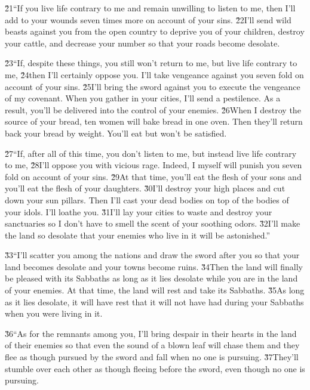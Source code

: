 \v{21}``If you live life contrary to me and remain unwilling to listen to me, then I'll add to your wounds seven times more on account of your sins. \v{22}I'll send wild beasts against you from the open country to deprive you of your children, destroy your cattle, and decrease your number so that your roads become desolate.

\v{23}``If, despite these things, you still won't return to me, but live life contrary to me, \v{24}then I'll certainly oppose you. I'll take vengeance against you seven fold on account of your sins. \v{25}I'll bring the sword against you to execute the vengeance of my covenant. When you gather in your cities, I'll send a pestilence. As a result, you'll be delivered into the control of your enemies. \v{26}When I destroy the source of your bread, ten women will bake bread in one oven. Then they'll return back your bread by weight. You'll eat but won't be satisfied.

\v{27}``If, after all of this time, you don't listen to me, but instead live life contrary to me, \v{28}I'll oppose you with vicious rage. Indeed, I myself will punish you seven fold on account of your sins. \v{29}At that time, you'll eat the flesh of your sons and you'll eat the flesh of your daughters. \v{30}I'll destroy your high places and cut down your sun pillars. Then I'll cast your dead bodies on top of the bodies of your idols. I'll loathe you. \v{31}I'll lay your cities to waste and destroy your sanctuaries so I don't have to smell the scent of your soothing odors. \v{32}I'll make the land so desolate that your enemies who live in it will be astonished.''

\v{33}``I'll scatter you among the nations and draw the sword after you so that your land becomes desolate and your towns become ruins. \v{34}Then the land will finally be pleased with its Sabbaths as long as it lies desolate while you are in the land of your enemies. At that time, the land will rest and take its Sabbaths. \v{35}As long as it lies desolate, it will have rest that it will not have had during your Sabbaths when you were living in it.

\v{36}``As for the remnants among you, I'll bring despair in their hearts in the land of their enemies so that even the sound of a blown leaf will chase them and they flee as though pursued by the sword and fall when no one is pursuing. \v{37}They'll stumble over each other as though fleeing before the sword, even though no one is pursuing.


